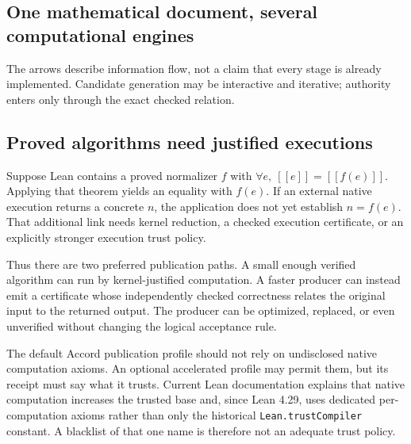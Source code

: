 \documentclass[11pt,letterpaper]{article}
\newcommand{\code}[1]{\nolinkurl{#1}}
\newcommand{\sem}[1]{[\![#1]\!]}
\theoremstyle{definition}
\begin{document}
\subsection{One mathematical document, several computational engines}
\begin{center}
\end{center}
The arrows describe information flow, not a claim that every stage is already
implemented. Candidate generation may be interactive and iterative; authority
enters only through the exact checked relation.

\subsection{Proved algorithms need justified executions}
Suppose Lean contains a proved normalizer \(f\) with
\(\forall e,\ \sem e=\sem{f(e)}\). Applying that theorem yields an equality with
\(f(e)\). If an external native execution returns a concrete \(n\), the application
does not yet establish \(n=f(e)\). That additional link needs kernel reduction,
a checked execution certificate, or an explicitly stronger execution trust policy.

Thus there are two preferred publication paths. A small enough verified algorithm
can run by kernel-justified computation. A faster producer can instead emit a
certificate whose independently checked correctness relates the original input
to the returned output. The producer can be optimized, replaced, or even
unverified without changing the logical acceptance rule.

The default Accord publication profile should not rely on undisclosed native
computation axioms. An optional accelerated profile may permit them, but its
receipt must say what it trusts. Current Lean documentation explains that native
computation increases the trusted base and, since Lean 4.29, uses dedicated
per-computation axioms rather than only the historical \code{Lean.trustCompiler}
constant\cite{leanvalidation}. A blacklist of that one name is therefore not an
adequate trust policy.
\end{document}
